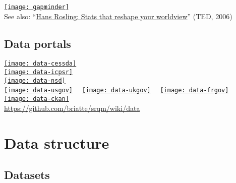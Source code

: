 \documentclass[t]{beamer}
\begin{document}
	\begin{frame}[c, plain]

		\begin{center}
			\href{http://www.gapminder.org/}%
  			{\texttt{[image: gapminder]}}\\[1em]

			\small{See also: ``\href{http://www.ted.com/talks/hans_rosling_shows_the_best_stats_you_ve_ever_seen.html}{Hans Rosling: Stats that reshape your worldview}'' (TED, 2006)}
		\end{center}
		
	\end{frame}

  \subsection{Data portals}

	\begin{frame}[c, plain]

		\begin{center}
			\href{http://www.cessda.org/}%
  			{\texttt{[image: data-cessda]}}\\[.5em]
			\href{http://www.icpsr.umich.edu/}%
  			{\texttt{[image: data-icpsr]}}\\[.5em]
			\href{http://www.nsd.uib.no/macrodataguide/}%
  			{\texttt{[image: data-nsd]}}\\[.5em]
			\href{http://www.data.gov/}%
  			{\texttt{[image: data-usgov]}}~~%
			\href{http://www.data.gov.uk/}%
  			{\texttt{[image: data-ukgov]}}~~%
			\href{http://www.data.gouv.fr/}%
  			{\texttt{[image: data-frgov]}}\\[.5em]
			\href{http://ckan.org//}%
  			{\texttt{[image: data-ckan]}}\\[1em]
				
			\small{\url{https://github.com/briatte/srqm/wiki/data}}
		\end{center}
		
	\end{frame}
	
	\section{Data structure}

  \subsection{Datasets}
  
\end{document}
